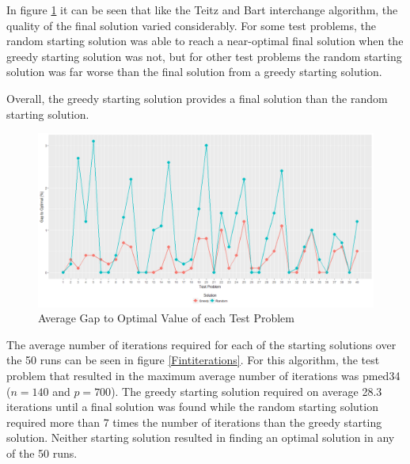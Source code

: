 \documentclass[11pt]{article}
\begin{document}
	In figure \ref{Fintgap} it can be seen that like the Teitz and Bart interchange algorithm, the quality of the final solution varied considerably.  For some test problems, the random starting solution was able to reach a near-optimal final solution when the greedy starting solution was not, but for other test problems the random starting solution was far worse than the final solution from a greedy starting solution.
	
	Overall, the greedy starting solution provides a final solution than the random starting solution.

				
				\begin{figure}[H]
					\begin{center}
						\includegraphics[width=14cm]{Fintgap.png}
						\caption{Average Gap to Optimal Value of each Test Problem}
						\label{Fintgap}
					\end{center}
				\end{figure}
				
	The average number of iterations required for each of the starting solutions over the 50 runs can be seen in figure \ref{Fintiterations}.  For this algorithm, the test problem that resulted in the maximum average number of iterations was pmed34 ($n=140$ and $p=700$).  The greedy starting solution required on average 28.3 iterations until a final solution was found while the random starting solution required more than 7 times the number of iterations than the greedy starting solution.  Neither starting solution resulted in finding an optimal solution in any of the 50 runs.
				
\end{document}
